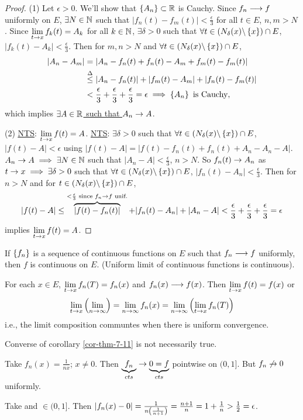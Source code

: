\documentclass[]{article}
\begin{document}
\begin{proof}
	(1)	Let $\epsilon>0$. We'll show that $\set{A_n}\subset\mb R$ is Cauchy.
	Since $f_n\lra f$ uniformly on $E$, $\exists N\in\mb N$ such that $|f_n(t)-f_m(t)|<\frac\epsilon3$ for all $t\in E$, $n,m>N$.
	Since $\ds\lim_{t\ra x} f_k(t) = A_k$ for all $k\in\mb N$, $\exists\delta>0$ such that $\forall t\in(N_\delta(x)\bs\set x)\cap E$, $|f_k(t)-A_k|<\frac\epsilon3$.
	Then for $m,n>N$ and $\forall t\in(N_\delta(x)\bs\set x)\cap E$,
	\begin{align*}
		|A_n-A_m|&=|A_n-f_n(t)+f_n(t)-A_m+f_m(t)-f_m(t)| \\
				 &\os\Delta\leq |A_n-f_n(t)| + |f_m(t)-A_m| + |f_n(t)-f_m(t)| \\
				 &< \frac\epsilon3+\frac\epsilon3+\frac\epsilon3=\epsilon \implies \set{A_n} \text{ is Cauchy},
	\end{align*}
	which implies \ul{$\exists A\in\mb R$ such that $A_n\ra A$}.

	(2) \ul{\ul{NTS}}: $\ds\lim_{t\ra x} f(t) = A$. 
	\ul{NTS}: $\exists\delta>0$ such that $\forall t\in(N_\delta(x)\bs\set x)\cap E$, $|f(t)-A|<\epsilon$ using $|f(t)-A| = |f(t)-f_n(t)+f_n(t)+A_n-A_n-A|$.
	$A_n\ra A\implies \exists N\in\mb N$ such that $|A_n-A|<\frac\epsilon3$, $n>N$.
	So $f_n(t)\ra A_n$ as $t\ra x \implies \exists\delta>0$ such that $\forall t\in(N_\delta(x)\bs\set x)\cap E$, $|f_n(t)-A_n|<\frac\epsilon3$.
	Then for $n>N$ and for $t\in(N_\delta(x)\bs\set x)\cap E$,
	\begin{align*}
	|f(t)-A| \leq \ob{<\frac\epsilon3\text{ since }f_n\ra f\text{ unif.}}{|f(t)-f_n(t)|} + |f_n(t)-A_n|+|A_n-A| < \frac\epsilon3+\frac\epsilon3+\frac\epsilon3 = \epsilon
	\end{align*}
	implies $\ds\lim_{t\ra x}f(t) =A$.
\end{proof}
\begin{corollary}
	\label{cor-thm-7-11}
	If $\set{f_n}$ is a sequence of continuous functions on $E$ such that $f_n\lra f$ uniformly, then $f$ is continuous on $E$. (Uniform limit of continuous functions is continuous).
\end{corollary}
\begin{remark}
	For each $x\in E$, $\ds\lim_{t\ra x} f_n(T)=f_n(x)$ and $f_n(x)\lra f(x)$.
	Then $\ds\lim_{t\ra x}f(t) = f(x)$ or $$\lim_{t\ra x}\plr{\lim_{n\ra\infty}} = \lim_{n\ra\infty} f_n(x) = \lim_{n\ra\infty}\plr{\lim_{t\ra x} f_n(T)}$$
	i.e., the limit composition communtes when there is uniform convergence.
\end{remark}
Converse of corollary \ref{cor-thm-7-11} is not necessarily true.
\begin{example}
	Take $f_n(x) = \frac1{nx}$; $x\neq0$. Then $\ub{cts}{f_n}\ra\ub{cts}{0=f}$ pointwise on $(0,1]$.
	But $f_n\not\ra0$ uniformly.

	Take  and  $\in(0,1]$. Then
	$ |f_n(x)-0| = \frac1{n\plr{\frac1{n+1}}} = \frac{n+1}n = 1+\frac1n>\frac12=\epsilon$.
\end{example}
\end{document}

